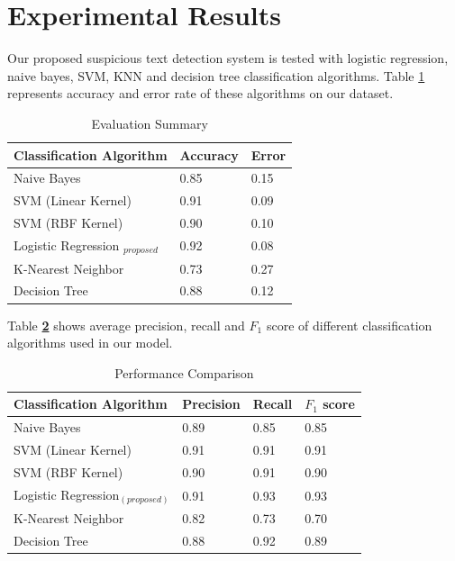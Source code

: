 \section{\textbf{Experimental Results}}
Our proposed suspicious text detection system is tested with logistic regression, naive bayes, SVM,  KNN and decision tree classification algorithms. Table \ref{AE} represents accuracy and error rate of these algorithms on our dataset.\par
\renewcommand{\arraystretch}{1.5}
\begin{table}[h!]
\begin{center}
\caption{Evaluation Summary}
\begin{tabular}{||m{4.65cm} | m{1.4cm}| m{1.35cm}||}
\hline
     Classification Algorithm & Accuracy  & Error  \\
\hline
\hline
    Naive Bayes \cite{yoo2015classification} & 0.85 & 0.15\\
\hline 
    SVM (Linear Kernel) \cite{wei2012text} & 0.91 & 0.09\\
\hline 
    SVM (RBF Kernel) \cite{villmann2017can}& 0.90 & 0.10\\
\hline 
    Logistic Regression\cite{sharma2015active} $_{proposed}$ & 0.92 & 0.08\\
\hline
    K-Nearest Neighbor \cite{harisinghaney2014text}& 0.73 & 0.27\\
\hline
    Decision Tree \cite{chavan2014survey}& 0.88 & 0.12\\
\hline
\end{tabular}
\label{AE}
\end{center}
\end{table}
Table \textbf{\ref{prr}} shows average precision, recall and $F_1$ score of different classification algorithms used in our model.
\renewcommand{\arraystretch}{1.5}
\begin{table}[h!]
\begin{center}
\caption{Performance Comparison}
\begin{tabular}{||m{3.3cm} | m{1.25cm}| m{1.2cm}| m{1.3cm}||}
\hline
     Classification Algorithm & Precision & Recall & $F_1$ score \\
\hline
\hline
    Naive Bayes & 0.89 & 0.85 & 0.85\\
\hline 
    SVM (Linear Kernel) & 0.91 & 0.91 & 0.91\\
\hline 
    SVM (RBF Kernel) & 0.90 & 0.91 & 0.90\\
\hline 
    Logistic Regression$_{(proposed)}$ & 0.91 & 0.93 & 0.93\\
\hline
    K-Nearest Neighbor & 0.82 & 0.73 & 0.70\\
\hline
    Decision Tree & 0.88 & 0.92 & 0.89\\
\hline
\end{tabular}
\label{prr}
\end{center}
\end{table}

